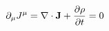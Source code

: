 \documentclass[preview]{standalone}
\begin{document}
\begin{align*}
\partial_{\mu}J^{\mu} = \nabla \cdot \mathbf{J} + \pdv{\rho}{t} = 0
\end{align*}
\end{document}
